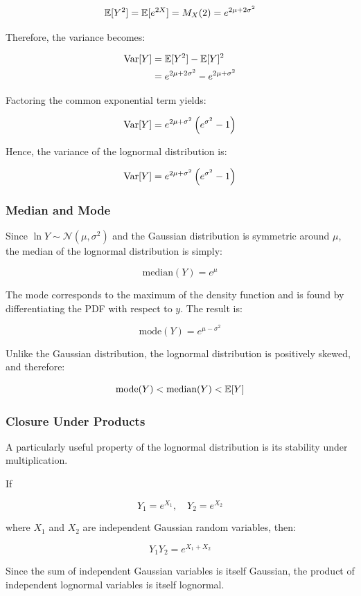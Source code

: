 \[
\mathbb{E}[Y^2]
=
\mathbb{E}[e^{2X}]
=
M_X(2)
=
e^{2\mu+2\sigma^2}
\]

Therefore, the variance becomes:

\begin{align*}
	\operatorname{Var}[Y]
	&=
	\mathbb{E}[Y^2]-\mathbb{E}[Y]^2 \\
	&=
	e^{2\mu+2\sigma^2}
	-
	e^{2\mu+\sigma^2}
\end{align*}

Factoring the common exponential term yields:

\begin{equation}
	\operatorname{Var}[Y]
	=
	e^{2\mu+\sigma^2}
	\left(e^{\sigma^2}-1\right)
\end{equation}

Hence, the variance of the lognormal distribution is:

\[
\operatorname{Var}[Y]
=
e^{2\mu+\sigma^2}
\left(e^{\sigma^2}-1\right)
\]

\subsubsection{Median and Mode}
Since $\ln Y \sim \mathcal{N}(\mu,\sigma^2)$ and the Gaussian distribution is symmetric around $\mu$, the median of the lognormal distribution is simply:

\[
\text{median}(Y)=e^\mu
\]

The mode corresponds to the maximum of the density function and is found by differentiating the PDF with respect to $y$. The result is:

\[
\text{mode}(Y)=e^{\mu-\sigma^2}
\]

Unlike the Gaussian distribution, the lognormal distribution is positively skewed, and therefore:

\[
\text{mode}(Y)
<
\text{median}(Y)
<
\mathbb{E}[Y]
\]

\subsubsection{Closure Under Products}
A particularly useful property of the lognormal distribution is its stability under multiplication.

If

\[
Y_1=e^{X_1},
\quad
Y_2=e^{X_2}
\]

where $X_1$ and $X_2$ are independent Gaussian random variables, then:

\[
Y_1Y_2=e^{X_1+X_2}
\]

Since the sum of independent Gaussian variables is itself Gaussian, the product of independent lognormal variables is itself lognormal.

